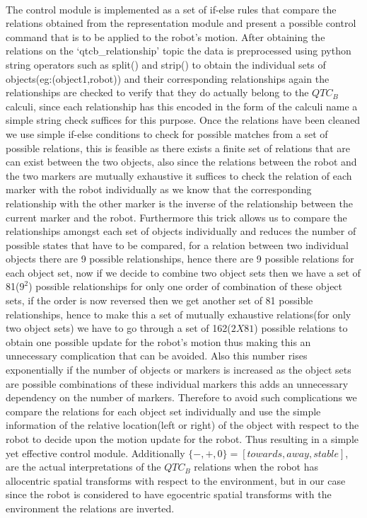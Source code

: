 \paragraph{}The control module is implemented as a set of if-else rules that compare the relations obtained from the representation module and present a possible control command that is to be applied to the robot's motion. After obtaining the relations on the `qtcb\_relationship' topic the data is preprocessed using python string operators such as split() and strip() to obtain the individual sets of objects(eg:(object1,robot)) and their corresponding relationships again the relationships are checked to verify that they do actually belong to the $QTC_B$ calculi, since each relationship has this encoded in the form of the calculi name a simple string check suffices for this purpose. Once the relations have been cleaned we use simple if-else conditions to check for possible matches from a set of possible relations, this is feasible as there exists a finite set of relations that are can exist between the two objects, also since the relations between the robot and the two markers are mutually exhaustive it suffices to check the relation of each marker with the robot individually as we know that the corresponding relationship with the other marker is the inverse of the relationship between the current marker and the robot. Furthermore this trick allows us to compare the relationships amongst each set of objects individually and reduces the number of possible states that have to be compared, for a relation between two individual objects there are 9 possible relationships, hence there are 9 possible relations for each object set, now if we decide to combine two object sets then we have a set of 81($9^2$) possible relationships for only one order of combination of these object sets, if the order is now reversed then we get another set of 81 possible relationships, hence to make this a set of mutually exhaustive relations(for only two object sets) we have to go through a set of 162($2 X 81$) possible relations to obtain one possible update for the robot's motion thus making this an unnecessary complication that can be avoided. Also this number rises exponentially if the number of objects or markers is increased as the object sets are possible combinations of these individual markers this adds an unnecessary dependency on the number of markers. Therefore to avoid such complications we compare the relations for each object set individually and use the simple information of the relative location(left or right) of the object with respect to the robot to decide upon the motion update for the robot. Thus resulting in a simple yet effective control module. Additionally $\{-,+,0\} = [towards, away, stable]$, are the actual interpretations of the $QTC_B$ relations when the robot has allocentric spatial transforms with respect to the environment, but in our case since the robot is considered to have egocentric spatial transforms with the environment the relations are inverted. 


